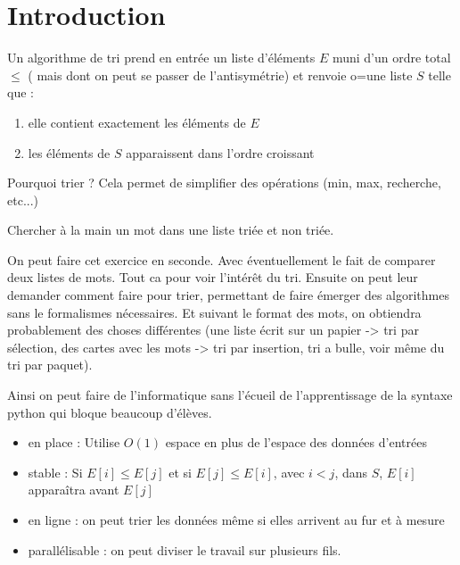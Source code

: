 
\section{Introduction}

\begin{definition}
	Un algorithme de tri prend en entrée un liste d'éléments $E$ muni d'un ordre total $\leq$ ( mais dont on peut se passer de l'antisymétrie) et renvoie o=une liste $S$ telle que : \begin{enumerate}
		\item elle contient exactement les éléments de $E$
		\item les éléments de $S$ apparaissent dans l'ordre croissant
	\end{enumerate}
\end{definition}

\begin{appl}
	Pourquoi trier ? Cela permet de simplifier des opérations (min, max, recherche, etc...)
\end{appl}

\begin{exercise}
	Chercher à la main un mot dans une liste triée et non triée.
\end{exercise}

\begin{com}
	\label{08-activite}
	On peut faire cet exercice en seconde. Avec éventuellement le fait de comparer deux listes de mots. Tout ca pour voir l'intérêt du tri. Ensuite on peut leur demander comment faire pour trier, permettant de faire émerger des algorithmes sans le formalismes nécessaires. Et suivant le format des mots, on obtiendra probablement des choses différentes (une liste écrit sur un papier -> tri par sélection, des cartes avec les mots -> tri par insertion, tri a bulle, voir même du tri par paquet).
	
	Ainsi on peut faire de l'informatique sans l'écueil de  l'apprentissage de la syntaxe python qui bloque beaucoup d'élèves.
\end{com}

\begin{definition}
	\begin{itemize}[label=$\bullet$]
		\item en place : Utilise $O(1)$ espace en plus de l'espace des données d'entrées
		\item stable : Si $E[i] \leq E[j]$ et si $E[j] \leq E[i]$, avec $i < j$, dans $S$, $E[i]$ apparaîtra avant $E[j]$
		\item en ligne : on peut trier les données même si elles arrivent au fur et à mesure
		\item parallélisable : on peut diviser le travail sur plusieurs fils.
	\end{itemize}
\end{definition}

